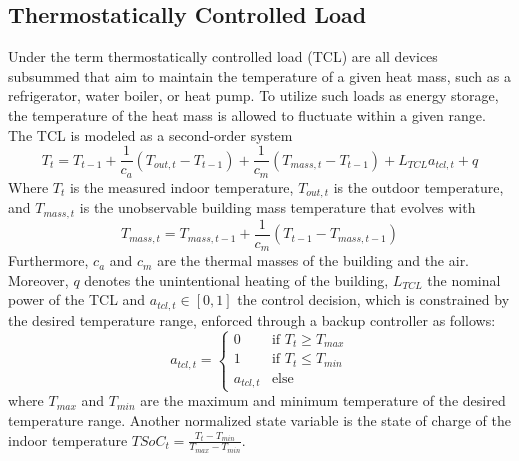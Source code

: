 \documentclass{article}
\theoremstyle{plain}
\theoremstyle{definition}
\theoremstyle{remark}
\begin{document}
\subsection{Thermostatically Controlled Load}
Under the term thermostatically controlled load (TCL) are all devices subsummed that aim to maintain the temperature of a given heat mass, such as a refrigerator, water boiler, or heat pump. To utilize such loads as energy storage, the temperature of the heat mass is allowed to fluctuate within a given range. The TCL is modeled as a second-order system
    \begin{equation}
        T_t = T_{t-1} + \frac{1}{c_a} (T_{out, t} - T_{t-1}) + \frac{1}{c_m} (T_{mass,t} - T_{t-1}) + L_{TCL} a_{tcl,t} + q
    \end{equation}
    Where $T_t$ is the measured indoor temperature, $T_{out, t}$ is the outdoor temperature, and $T_{mass,t}$ is the unobservable building mass temperature that evolves with
    \begin{equation}
        T_{mass, t} = T_{mass, t-1} + \frac{1}{c_m} (T_{t-1} - T_{mass, t-1})
    \end{equation}
    Furthermore, $c_a$ and $c_m$ are the thermal masses of the building and the air. Moreover, $q$ denotes the unintentional heating of the building, $L_{TCL}$ the nominal power of the TCL and $a_{tcl, t} \in [0, 1]$ the control decision, which is constrained by the desired temperature range, enforced through a backup controller as follows:
    \begin{equation}
        a_{tcl, t} = \begin{cases}
            0 & \text{if } T_t \geq T_{max} \\
            1 & \text{if } T_t \leq T_{min} \\
            a_{tcl, t} & \text{else} 
        \end{cases}
    \end{equation}
    where $T_{max}$ and $T_{min}$ are the maximum and minimum temperature of the desired temperature range. Another normalized state variable is the state of charge of the indoor temperature $TSoC_t = \frac{T_t - T_{min}}{T_{max} - T_{min}}$.
\end{document}
